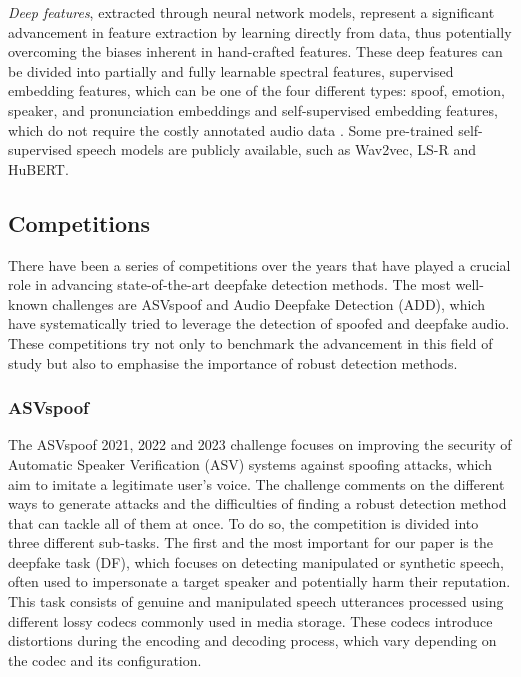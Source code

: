 \documentclass{Interspeech}
\begin{document}
\textit{Deep features}, extracted through neural network models, represent a significant advancement in feature extraction by learning directly from data, thus potentially overcoming the biases inherent in hand-crafted features. These deep features can be divided into partially and fully learnable spectral features, supervised embedding features, which can be one of the four different types: spoof, emotion, speaker, and pronunciation embeddings and self-supervised embedding features, which do not require the costly annotated audio data \cite{yu2017dnn}. Some pre-trained self-supervised speech models are publicly available, such as Wav2vec, LS-R and HuBERT.

\subsection{Competitions}
There have been a series of competitions over the years that have played a
crucial role in advancing state-of-the-art deepfake detection methods. The most
well-known challenges are ASVspoof and Audio Deepfake Detection (ADD), which
have systematically tried to leverage the detection of spoofed and deepfake
audio. These competitions try not only to benchmark the advancement in this
field of study but also to emphasise the importance of robust detection
methods.

\subsubsection{ASVspoof} The ASVspoof 2021, 2022 and 2023 \cite{ASVspoof_21, jung2022sasv, ge2023can}
challenge focuses on improving the security of Automatic Speaker Verification
(ASV) systems against spoofing attacks, which aim to imitate a legitimate
user's voice. The challenge comments on the different ways to generate attacks
and the difficulties of finding a robust detection method that can tackle all
of them at once. To do so, the competition is divided into three different
sub-tasks. The first and the most important for our paper is the deepfake task
(DF), which focuses on detecting manipulated or synthetic speech, often used to
impersonate a target speaker and potentially harm their reputation.
This task consists of genuine and manipulated speech utterances processed using
different lossy codecs commonly used in media storage. These codecs introduce
distortions during the encoding and decoding process, which vary depending on
the codec and its configuration.
\end{document}
